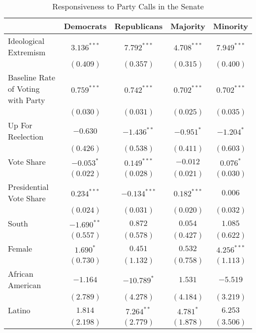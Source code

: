 \documentclass[12pt]{article}
\begin{document}
\begin{table}[H]
	\begin{center}
		\caption{Responsiveness to Party Calls in the Senate}
		\begin{tabular}{l c c c c }
			\hline
			& Democrats & Republicans & Majority & Minority \\
			\hline
			Ideological Extremism & $3.136^{***}$  & $7.792^{***}$   & $4.708^{***}$  & $7.949^{***}$ \\
			& $(0.409)$      & $(0.357)$       & $(0.315)$      & $(0.400)$     \\
			Baseline Rate of Voting with Party              & $0.759^{***}$  & $0.742^{***}$   & $0.702^{***}$  & $0.702^{***}$ \\
			& $(0.030)$      & $(0.031)$       & $(0.025)$      & $(0.035)$     \\
			Up For Reelection    & $-0.630$       & $-1.436^{**}$   & $-0.951^{*}$   & $-1.204^{*}$  \\
			& $(0.426)$      & $(0.538)$       & $(0.411)$      & $(0.603)$     \\
			Vote Share            & $-0.053^{*}$  & $0.149^{***}$  & $-0.012$       & $0.076^{*}$   \\
			& $(0.022)$     & $(0.028)$      & $(0.021)$      & $(0.030)$     \\
			Presidential Vote Share       & $0.234^{***}$ & $-0.134^{***}$ & $0.182^{***}$  & $0.006$       \\
			& $(0.024)$     & $(0.031)$      & $(0.020)$      & $(0.032)$     \\
			South                  & $-1.690^{**}$  & $0.872$         & $0.054$        & $1.085$       \\
			& $(0.557)$      & $(0.578)$       & $(0.427)$      & $(0.622)$     \\
			Female                 & $1.690^{*}$    & $0.451$         & $0.532$        & $4.256^{***}$ \\
			& $(0.730)$      & $(1.132)$       & $(0.758)$      & $(1.113)$     \\
			African American                   & $-1.164$       & $-10.789^{*}$   & $1.531$        & $-5.519$      \\
			& $(2.789)$      & $(4.278)$       & $(4.184)$      & $(3.219)$     \\
			Latino                 & $1.814$        & $7.264^{**}$    & $4.781^{*}$    & $6.253$       \\
			& $(2.198)$      & $(2.779)$       & $(1.878)$      & $(3.506)$     \\

\end{tabular}
\end{center}
\end{table}
\end{document}
